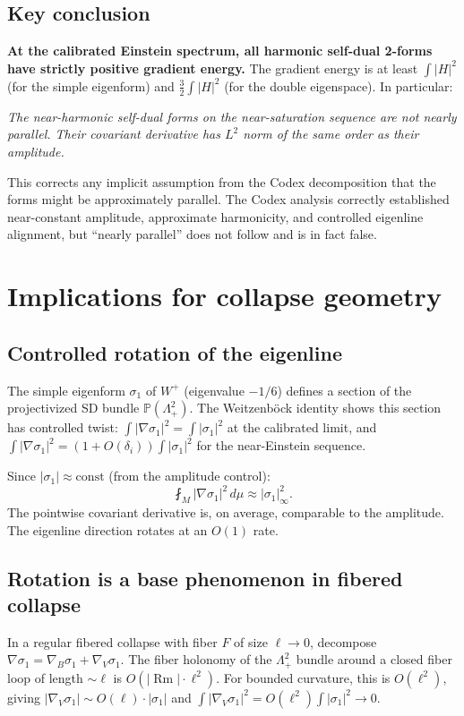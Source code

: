 \subsection{Key conclusion}
\textbf{At the calibrated Einstein spectrum, all harmonic self-dual 2-forms
have strictly positive gradient energy.} The gradient energy is at least
$\int|H|^2$ (for the simple eigenform) and $\frac32\int|H|^2$
(for the double eigenspace). In particular:

\medskip\noindent
\textit{The near-harmonic self-dual forms on the near-saturation sequence
are not nearly parallel. Their covariant derivative has $L^2$ norm
of the same order as their amplitude.}

\medskip\noindent
This corrects any implicit assumption from the Codex decomposition
that the forms might be approximately parallel. The Codex analysis
correctly established near-constant amplitude, approximate harmonicity,
and controlled eigenline alignment, but ``nearly parallel'' does not follow
and is in fact false.

\section{Implications for collapse geometry}

\subsection{Controlled rotation of the eigenline}
The simple eigenform $\sigma_1$ of $W^+$ (eigenvalue $-1/6$) defines
a section of the projectivized SD bundle $\mathbb{P}(\Lambda^2_+)$.
The Weitzenb\"ock identity shows this section has controlled twist:
$\int|\nabla\sigma_1|^2 = \int|\sigma_1|^2$ at the calibrated limit,
and $\int|\nabla\sigma_1|^2 = (1 + O(\delta_i))\int|\sigma_1|^2$
for the near-Einstein sequence.

Since $|\sigma_1| \approx \mathrm{const}$ (from the amplitude control):
\[
\fint_M |\nabla\sigma_1|^2\,d\mu \approx |\sigma_1|^2_\infty.
\]
The pointwise covariant derivative is, on average, comparable to the
amplitude. The eigenline direction rotates at an $O(1)$ rate.

\subsection{Rotation is a base phenomenon in fibered collapse}
In a regular fibered collapse with fiber $F$ of size $\ell \to 0$,
decompose $\nabla\sigma_1 = \nabla_B\sigma_1 + \nabla_V\sigma_1$.
The fiber holonomy of the $\Lambda^2_+$ bundle around a closed
fiber loop of length $\sim\ell$ is $O(|\operatorname{Rm}|\cdot\ell^2)$.
For bounded curvature, this is $O(\ell^2)$, giving
$|\nabla_V\sigma_1| \sim O(\ell)\cdot|\sigma_1|$ and
$\int|\nabla_V\sigma_1|^2 = O(\ell^2)\int|\sigma_1|^2 \to 0$.

